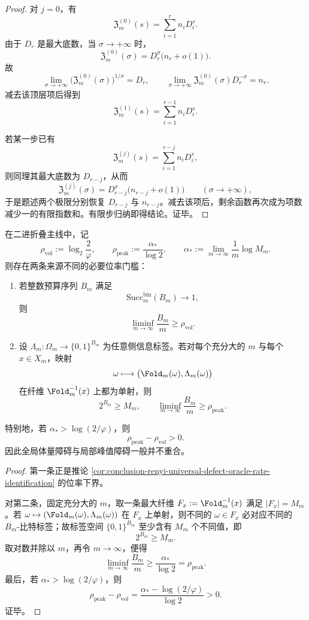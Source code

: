 \begin{proof}
对 \(j=0\)，有
\[
\mathfrak Z_m^{(0)}(s)=\sum_{i=1}^{r}n_iD_i^s.
\]
由于 \(D_r\) 是最大底数，当 \(\sigma\to+\infty\) 时，
\[
\mathfrak Z_m^{(0)}(\sigma)
=
D_r^{\sigma}\bigl(n_r+o(1)\bigr).
\]
故
\[
\lim_{\sigma\to+\infty}\bigl(\mathfrak Z_m^{(0)}(\sigma)\bigr)^{1/\sigma}=D_r,
\qquad
\lim_{\sigma\to+\infty}\mathfrak Z_m^{(0)}(\sigma)D_r^{-\sigma}=n_r.
\]
减去该顶层项后得到
\[
\mathfrak Z_m^{(1)}(s)=\sum_{i=1}^{r-1}n_iD_i^s.
\]

若某一步已有
\[
\mathfrak Z_m^{(j)}(s)=\sum_{i=1}^{r-j}n_iD_i^s,
\]
则同理其最大底数为 \(D_{r-j}\)，从而
\[
\mathfrak Z_m^{(j)}(\sigma)
=
D_{r-j}^{\sigma}\bigl(n_{r-j}+o(1)\bigr)
\qquad (\sigma\to+\infty),
\]
于是题述两个极限分别恢复 \(D_{r-j}\) 与 \(n_{r-j}\)。减去该项后，剩余函数再次成为项数减少一的有限指数和。有限步归纳即得结论。证毕。
\end{proof}

\begin{theorem}[体量阈值与峰值阈值的分离]\label{thm:conclusion-volume-peak-threshold-separation}
在二进折叠主线中，记
\[
\rho_{\mathrm{vol}}:=\log_2\frac{2}{\varphi},
\qquad
\rho_{\mathrm{peak}}:=\frac{\alpha_\ast}{\log 2},
\qquad
\alpha_\ast:=\lim_{m\to\infty}\frac1m\log M_m.
\]
则存在两条来源不同的必要位率门槛：
\begin{enumerate}
  \item 若整数预算序列 \(B_m\) 满足
  \[
  \mathrm{Succ}^{\mathrm{bin}}_m(B_m)\longrightarrow 1,
  \]
  则
  \[
  \liminf_{m\to\infty}\frac{B_m}{m}\ge \rho_{\mathrm{vol}}.
  \]
  \item 设 \(\Lambda_m:\Omega_m\to\{0,1\}^{B_m}\) 为任意侧信息标签。若对每个充分大的 \(m\) 与每个 \(x\in X_m\)，映射
  \[
  \omega\longmapsto \bigl(\Fold_m(\omega),\Lambda_m(\omega)\bigr)
  \]
  在纤维 \(\Fold_m^{-1}(x)\) 上都为单射，则
  \[
  2^{B_m}\ge M_m,
  \qquad
  \liminf_{m\to\infty}\frac{B_m}{m}\ge \rho_{\mathrm{peak}}.
  \]
\end{enumerate}
特别地，若 \(\alpha_\ast>\log(2/\varphi)\)，则
\[
\rho_{\mathrm{peak}}-\rho_{\mathrm{vol}}>0.
\]
因此全局体量障碍与局部峰值障碍一般并不重合。
\end{theorem}

\begin{proof}
第一条正是推论 \ref{cor:conclusion-renyi-universal-defect-oracle-rate-identification} 的位率下界。

对第二条，固定充分大的 \(m\)，取一条最大纤维 \(F_x:=\Fold_m^{-1}(x)\) 满足 \(|F_x|=M_m\)。若 \(\omega\mapsto(\Fold_m(\omega),\Lambda_m(\omega))\) 在 \(F_x\) 上单射，则不同的 \(\omega\in F_x\) 必对应不同的 \(B_m\)-比特标签；故标签空间 \(\{0,1\}^{B_m}\) 至少含有 \(M_m\) 个不同值，即
\[
2^{B_m}\ge M_m.
\]
取对数并除以 \(m\)，再令 \(m\to\infty\)，便得
\[
\liminf_{m\to\infty}\frac{B_m}{m}\ge \frac{\alpha_\ast}{\log 2}=\rho_{\mathrm{peak}}.
\]
最后，若 \(\alpha_\ast>\log(2/\varphi)\)，则
\[
\rho_{\mathrm{peak}}-\rho_{\mathrm{vol}}
=
\frac{\alpha_\ast-\log(2/\varphi)}{\log 2}>0.
\]
证毕。
\end{proof}

